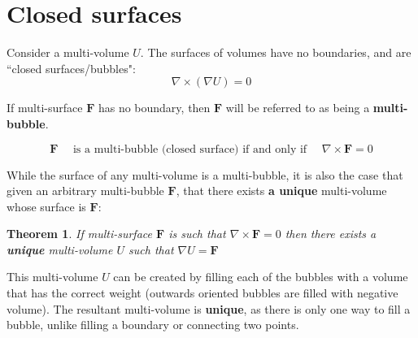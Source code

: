 \documentclass{book}
\newtheorem{thm}{Theorem}
\begin{document}
\section{Closed surfaces}

Consider a multi-volume \(U\). The surfaces of volumes have no boundaries, and are ``closed surfaces/bubbles":
\[\nabla \times (\nabla U) = 0\]    

If multi-surface \(\mathbf{F}\) has no boundary, then \(\mathbf{F}\) will be referred to as being a {\bf multi-bubble}.

\[\mathbf{F} \quad\text{ is a multi-bubble (closed surface) if and only if }\quad \nabla \times \mathbf{F} = 0\]

While the surface of any multi-volume is a multi-bubble, it is also the case that given an arbitrary multi-bubble \(\mathbf{F}\), that there exists {\bf a unique} multi-volume whose surface is \(\mathbf{F}\):

\begin{thm}
If multi-surface \(\mathbf{F}\) is such that \(\nabla \times \mathbf{F} = 0\)
then there exists a {\bf unique} multi-volume \(U\) such that \(\nabla U = \mathbf{F}\)
\end{thm}

This multi-volume \(U\) can be created by filling each of the bubbles with a volume that has the correct weight (outwards oriented bubbles are filled with negative volume). The resultant multi-volume is {\bf unique}, as there is only one way to fill a bubble, unlike filling a boundary or connecting two points.
\end{document}
